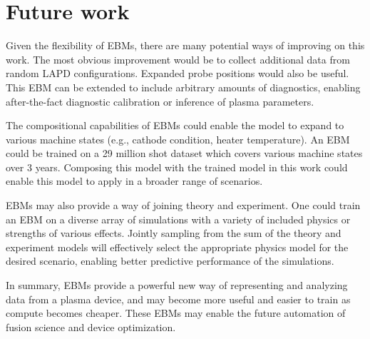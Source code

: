\section{Future work}
Given the flexibility of EBMs, there are many potential ways of improving on this work. The most obvious improvement would be to collect additional data from random LAPD configurations. Expanded probe positions would also be useful. This EBM can be extended to include arbitrary amounts of diagnostics, enabling after-the-fact diagnostic calibration or inference of plasma parameters. 

The compositional capabilities of EBMs could enable the model to expand to various machine states (e.g., cathode condition, heater temperature). An EBM could be trained on a 29 million shot dataset which covers various machine states over 3 years. Composing this model with the trained model in this work could enable this model to apply in a broader range of scenarios.

EBMs may also provide a way of joining theory and experiment. One could train an EBM on a diverse array of simulations with a variety of included physics or strengths of various effects. Jointly sampling from the sum of the theory and experiment models will effectively select the appropriate physics model for the desired scenario, enabling better predictive performance of the simulations. 

In summary, EBMs provide a powerful new way of representing and analyzing data from a plasma device, and may become more useful and easier to train as compute becomes cheaper. These EBMs may enable the future automation of fusion science and device optimization.



%
%
%
%
